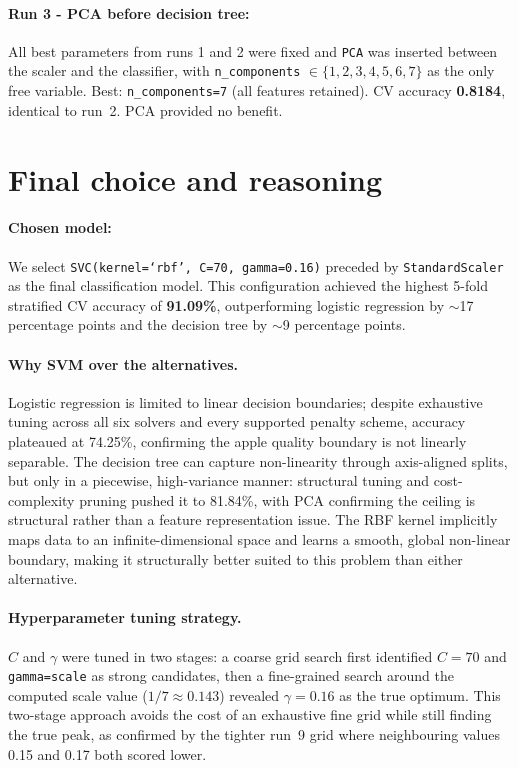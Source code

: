 \documentclass[11pt]{article}
\begin{document}
\paragraph{Run 3 - PCA before decision tree:}
All best parameters from runs 1 and 2 were fixed and \texttt{PCA} was inserted between the scaler and the classifier, with \texttt{n\_components} $\in \{1, 2, 3, 4, 5, 6, 7\}$ as the only free variable.
Best: \texttt{n\_components=7} (all features retained). CV accuracy \textbf{0.8184}, identical to run~2.
PCA provided no benefit.



\section{Final choice and reasoning}

\paragraph{Chosen model:}
We select \texttt{SVC(kernel=`rbf', C=70, gamma=0.16)} preceded by \texttt{StandardScaler} as the final classification model.
This configuration achieved the highest 5-fold stratified CV accuracy of \textbf{91.09\%}, outperforming logistic regression by $\sim$17 percentage points and the decision tree by $\sim$9 percentage points.

\paragraph{Why SVM over the alternatives.}
Logistic regression is limited to linear decision boundaries; despite exhaustive tuning across all six solvers and every supported penalty scheme, accuracy plateaued at 74.25\%, confirming the apple quality boundary is not linearly separable.
The decision tree can capture non-linearity through axis-aligned splits, but only in a piecewise, high-variance manner: structural tuning and cost-complexity pruning pushed it to 81.84\%, with PCA confirming the ceiling is structural rather than a feature representation issue.
The RBF kernel implicitly maps data to an infinite-dimensional space and learns a smooth, global non-linear boundary, making it structurally better suited to this problem than either alternative.


\paragraph{Hyperparameter tuning strategy.}
$C$ and $\gamma$ were tuned in two stages: a coarse grid search first identified $C=70$ and \texttt{gamma=scale} as strong candidates, then a fine-grained search around the computed scale value ($1/7 \approx 0.143$) revealed $\gamma=0.16$ as the true optimum.
This two-stage approach avoids the cost of an exhaustive fine grid while still finding the true peak, as confirmed by the tighter run~9 grid where neighbouring values 0.15 and 0.17 both scored lower.
\end{document}
